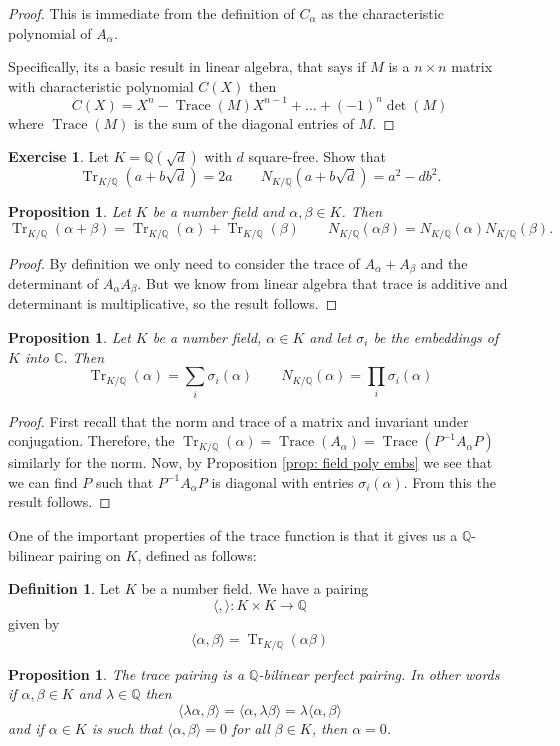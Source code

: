 \documentclass[11pt,a4paper]{report}
\theoremstyle{plain}
\newtheorem{prop}[subsection]{Proposition}
\theoremstyle{definition}
\newtheorem{defn}[subsection]{Definition}
\theoremstyle{definition}
\newtheorem{question}[subsection]{Exercise}
\newcommand{\Tr}{\operatorname{Tr}}
\def\CC{\mathbb{C}}
\def\QQ{\mathbb{Q}}
\def \a{\alpha}
\def \lam {\lambda}
\DeclareMathOperator{\Trace}{Trace}
\begin{document}
	\begin{proof}
		This is immediate from the definition of $C_\a$ as the characteristic polynomial of $A_\a$.
		
		Specifically, its a basic result in linear algebra, that says if $M$ is a $n\times n$ matrix with characteristic polynomial $C(X)$ then \[C(X)=X^n-\Trace(M)X^{n-1}+\dots+(-1)^n\det(M)   \] where $\Trace(M)$ is the sum of the diagonal entries of $M$.
	\end{proof}
	
	\begin{question}
		Let $K=\QQ(\sqrt{d})$ with $d$ square-free. Show that \[\Tr_{K/\QQ}(a+b\sqrt{d})=2a \qquad N_{K/\QQ}(a+b\sqrt{d})=a^2-db^2.\] 
	\end{question}
	
	
	\begin{prop}
		Let $K$ be a number field and $\a,\beta \in K$. Then \[\Tr_{K/\QQ}(\a+\beta)=\Tr_{K/\QQ}(\a)+\Tr_{K/\QQ}(\beta) \qquad N_{K/\QQ}(\a \beta )=N_{K/\QQ}(\a)N_{K/\QQ}(\beta).\]
	\end{prop}
	
	\begin{proof}
		By definition we only need to consider the trace of $A_\a+A_\beta$ and the determinant of $A_\a A_\beta$. But we know from linear algebra that trace is additive and determinant is multiplicative, so the result follows.
	\end{proof}
	
	\begin{prop}\label{prop: alt defn of norm and trace}
		Let $K$ be a number field, $\a \in K$ and let $\sigma_i$ be the embeddings of $K$ into $\CC$. Then \[\Tr_{K/\QQ}(\a) =\sum_i \sigma_i(\a) \qquad N_{K/\QQ}(\a)=\prod_i \sigma_i(\a)  \]
	\end{prop}
	
	\begin{proof}
		First recall that the norm and trace of a matrix and invariant under conjugation. Therefore, the $\Tr_{K/\QQ}(\a)=\Trace(A_\a)=\Trace(P^{-1}A_\a P)$ similarly for the norm. Now, by Proposition \ref{prop: field poly embs} we see that we can find $P$ such that $P^{-1}A_\a P$ is diagonal with entries $\sigma_i(\a)$. From this the result follows. 
	\end{proof}
	
	One of the important properties of the trace function is that it gives us a $\QQ$-bilinear pairing on $K$, defined as follows:
	\begin{defn}
		Let $K$ be a number field. We have a pairing \[\langle , \rangle : K \times K \to \QQ\] given by \[\langle \a ,\beta \rangle= \Tr_{K/\QQ}(\a \beta)\]
	\end{defn}
	\begin{prop}\label{prop: tr perfect}
		The trace pairing is a $\QQ$-bilinear perfect pairing. In other words if $\a,\beta \in K$ and $\lam \in \QQ$ then \[\langle \lam \a ,\beta \rangle=\langle \a , \lam \beta \rangle=\lam \langle \a ,\beta \rangle\] and if $\a \in K$ is such that $\langle \a ,\beta \rangle =0$ for all $\beta \in K$, then $\a=0$.
	\end{prop}
	
\end{document}

